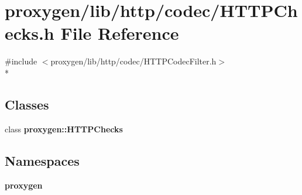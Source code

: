\section{proxygen/lib/http/codec/\+H\+T\+T\+P\+Checks.h File Reference}
\label{HTTPChecks_8h}
{\ttfamily \#include $<$proxygen/lib/http/codec/\+H\+T\+T\+P\+Codec\+Filter.\+h$>$}\\*
\subsection*{Classes}
\begin{DoxyCompactItemize}
\item 
class {\bf proxygen\+::\+H\+T\+T\+P\+Checks}
\end{DoxyCompactItemize}
\subsection*{Namespaces}
\begin{DoxyCompactItemize}
\item 
 {\bf proxygen}
\end{DoxyCompactItemize}
